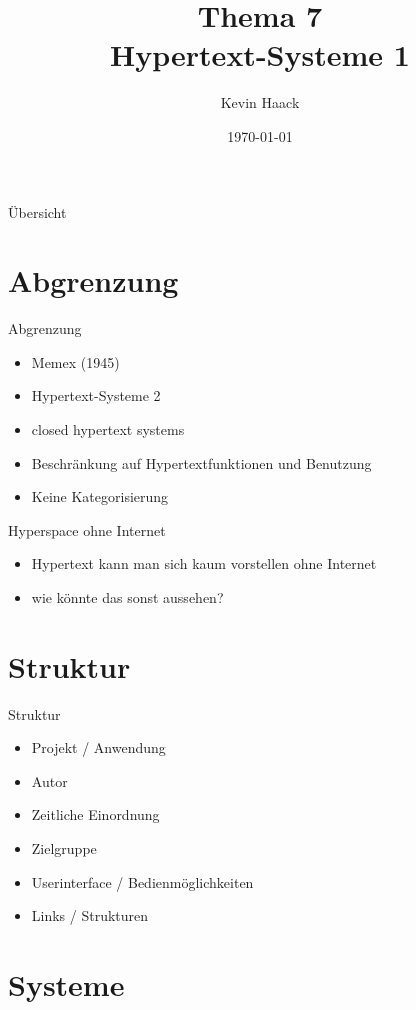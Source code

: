 \documentclass{beamer}
\title{Thema 7\\Hypertext-Systeme 1}
\author{Kevin Haack}
\institute{Universität Paderborn}
\date{\today}
\begin{document}
\begin{frame}
  \titlepage
\end{frame}

\begin{frame}{Übersicht}
\tableofcontents
\end{frame}

\section{Abgrenzung}
\begin{frame}{Abgrenzung}
	\begin{itemize}
		\item Memex (1945)
		\item Hypertext-Systeme 2
		\item closed hypertext systems
		\item Beschränkung auf Hypertextfunktionen und Benutzung
		\item Keine Kategorisierung
	\end{itemize}
\end{frame}

\begin{frame}{Hyperspace ohne Internet}
	\begin{itemize}
		\item Hypertext kann man sich kaum vorstellen ohne Internet
		\item wie könnte das sonst aussehen?
	\end{itemize}
\end{frame}




\section{Struktur}

\begin{frame}{Struktur}
\begin{itemize}
	\item Projekt / Anwendung
	\item Autor
	\item Zeitliche Einordnung
	\item Zielgruppe
	\item Userinterface / Bedienmöglichkeiten
	\item Links / Strukturen
\end{itemize}
\end{frame}

\section{Systeme}










\end{document}
